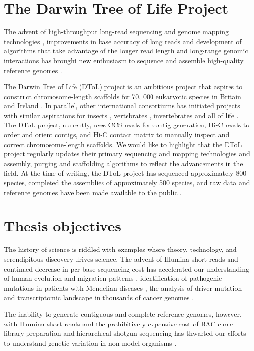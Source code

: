 \section{The Darwin Tree of Life Project}

The advent of high-throughput long-read sequencing and genome mapping technologies \cite{}, improvements in base accuracy of long reads \cite{} and development of algorithms that take advantage of the longer read length and long-range genomic interactions \cite{} has brought new enthusiasm to sequence and assemble high-quality reference genomes \cite {}. 

The Darwin Tree of Life (DToL) project is an ambitious project that aspires to construct chromosome-length scaffolds for 70, 000 eukaryotic species in Britain and Ireland \cite{}. In parallel, other international consortiums has initiated projects with similar aspirations for insects \cite{}, vertebrates \cite{}, invertebrates \cite{} and all of life \cite{}. The DToL project, currently, uses CCS reads for contig generation, Hi-C reads to order and orient contigs, and Hi-C contact matrix to manually inspect and correct chromosome-length scaffolds. We would like to highlight that the DToL project regularly updates their primary sequencing and mapping technologies and assembly, purging and scaffolding algorithms to reflect the advancements in the field. At the time of writing, the DToL project has sequenced approximately 800 species, completed the assemblies of approximately 500 species, and raw data and reference genomes have been made available to the public \cite{}. 

\section{Thesis objectives}

The history of science is riddled with examples where theory, technology, and serendipitous discovery drives science. The advent of Illumina short reads and continued decrease in per base sequencing cost has accelerated our understanding of human evolution and migration patterns \cite{}, identification of pathogenic mutations in patients with Mendelian diseases \cite{}, the analysis of driver mutation and transcriptomic landscape in thousands of cancer genomes \cite{}. 

The inability to generate contiguous and complete reference genomes, however, with Illumina short reads and the prohibitively expensive cost of BAC clone library preparation and hierarchical shotgun sequencing has thwarted our efforts to understand genetic variation in non-model organisms \cite{}.


